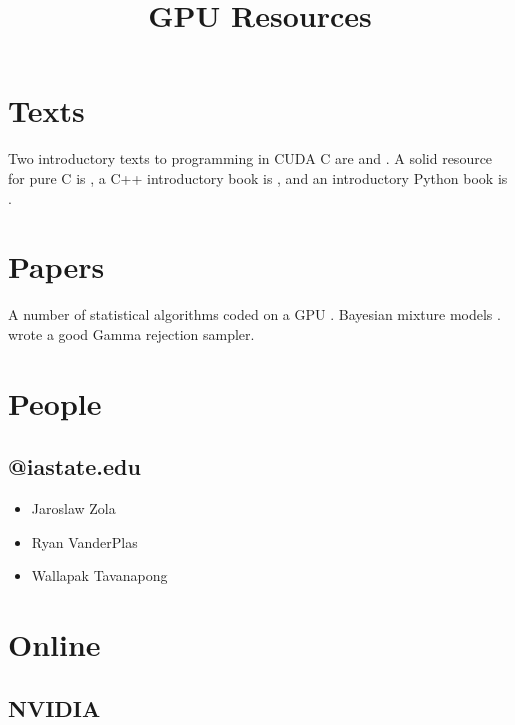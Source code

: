 \documentclass{article}
\title{GPU Resources}
\begin{document}
 

\section{Texts}


Two introductory texts to programming in CUDA C are \cite{sanders2010cuda} and \cite{kirk2010programming}. A solid resource for pure C is \cite{kernighan}, a C++ introductory book is \cite{Savitch}, and an introductory Python book is \cite{beazley}.

\section{Papers}

A number of statistical algorithms coded on a GPU \citep{lee2010utility}. Bayesian mixture models \citep{suchard2010understanding}. \citep{marsaglia-tsang} wrote a good Gamma rejection sampler.

\section{People}

\subsection{@iastate.edu}

\begin{itemize}
\item Jaroslaw Zola
\item Ryan VanderPlas
\item Wallapak Tavanapong
\end{itemize}

\section{Online}

\subsection{NVIDIA}
\end{document}
